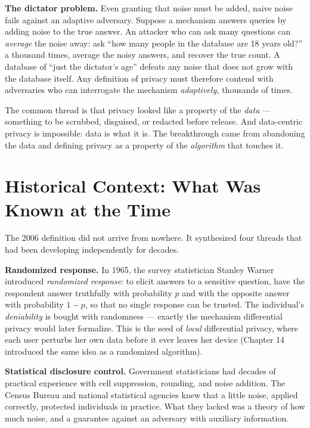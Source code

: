 \textbf{The dictator problem.} Even granting that noise must be added, naive noise fails against an adaptive adversary. Suppose a mechanism answers queries by adding noise to the true answer. An attacker who can ask many questions can \emph{average} the noise away: ask ``how many people in the database are 18 years old?'' a thousand times, average the noisy answers, and recover the true count. A database of ``just the dictator's age'' defeats any noise that does not grow with the database itself. Any definition of privacy must therefore contend with adversaries who can interrogate the mechanism \emph{adaptively,} thousands of times.

The common thread is that privacy looked like a property of the \emph{data} --- something to be scrubbed, disguised, or redacted before release. And data-centric privacy is impossible: data is what it is. The breakthrough came from abandoning the data and defining privacy as a property of the \emph{algorithm} that touches it.

\section{Historical Context: What Was Known at the Time}
\label{sec:dp:context}

The 2006 definition did not arrive from nowhere. It synthesized four threads that had been developing independently for decades. 

\textbf{Randomized response.} In 1965, the survey statistician Stanley Warner introduced \emph{randomized response}: to elicit answers to a sensitive question, have the respondent answer truthfully with probability $p$ and with the opposite answer with probability $1-p$, so that no single response can be trusted. \cite{warner1965}  The individual's \emph{deniability} is bought with randomness --- exactly the mechanism differential privacy would later formalize. This is the seed of \emph{local} differential privacy, where each user perturbs her own data before it ever leaves her device (Chapter 14 introduced the same idea as a randomized algorithm).

\textbf{Statistical disclosure control.} Government statisticians had decades of practical experience with cell suppression, rounding, and noise addition. The Census Bureau and national statistical agencies knew that a little noise, applied correctly, protected individuals in practice. What they lacked was a theory of how much noise, and a guarantee against an adversary with auxiliary information. 

